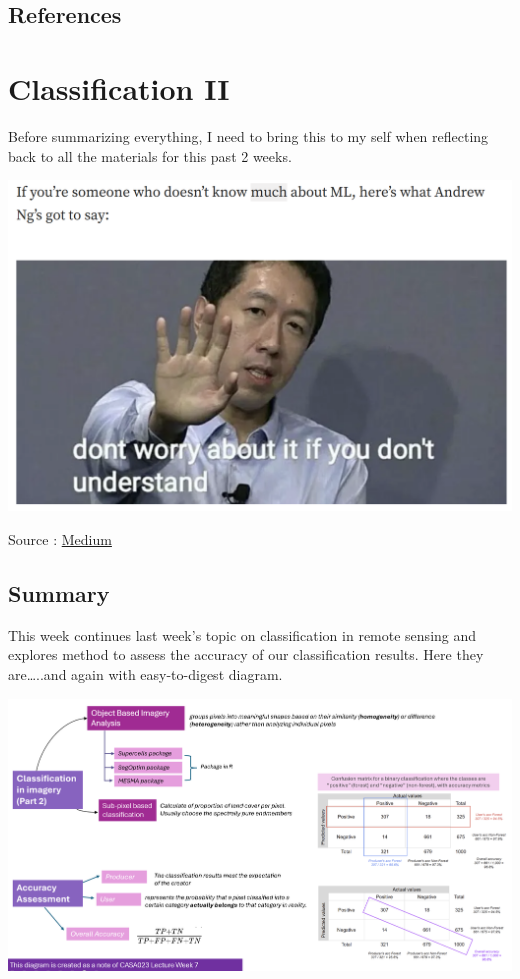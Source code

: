 \documentclass[
  letterpaper,
  DIV=11,
  numbers=noendperiod]{scrreprt}
\begin{document}
\hypertarget{references-4}{%
\section{References}\label{references-4}}


\hypertarget{classification-ii}{%
\chapter{Classification II}\label{classification-ii}}

Before summarizing everything, I need to bring this to my self when
reflecting back to all the materials for this past 2 weeks.

\includegraphics[width=5.5in,height=\textheight]{images/clipboard-2560646539.png}

Source :
\href{http://medium.com/nybles/understanding-machine-learning-through-memes-4580b67527bf}{Medium}

\hypertarget{summary-6}{%
\section{Summary}\label{summary-6}}

This week continues last week's topic on classification in remote
sensing and explores method to assess the accuracy of our classification
results. Here they are\ldots..and again with easy-to-digest diagram.

\includegraphics{images/clipboard-2572872984.png}
\end{document}
